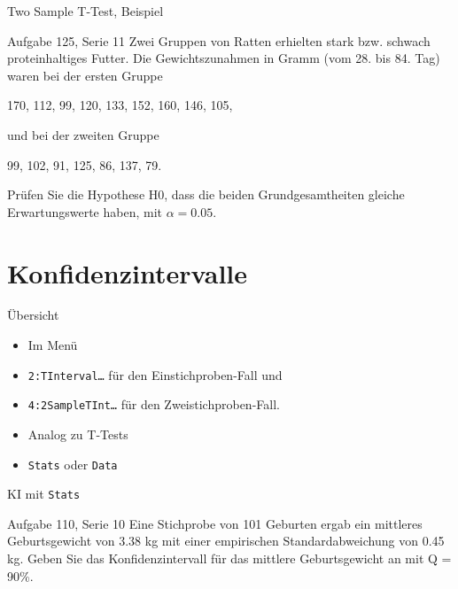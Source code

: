 \documentclass[handout]{beamer}
\newlength{\tikey}
\newcommand{\keystroke}[1]{\settowidth{\tikey}{\scriptsize #1}\psframebox[framearc=0.2]{\parbox{\tikey}{\scriptsize #1}}}
\begin{document}
\begin{frame}{Two Sample T-Test, Beispiel}
\begin{beamerboxesrounded}[shadow]{Aufgabe 125, Serie 11}
Zwei Gruppen von Ratten erhielten stark bzw. schwach proteinhaltiges Futter.
Die Gewichtszunahmen in Gramm (vom 28. bis 84. Tag) waren bei der ersten Gruppe
\begin{center}
170, 112, 99, 120, 133, 152, 160, 146, 105,
\end{center}
und bei der zweiten Gruppe
\begin{center}
99, 102, 91, 125, 86, 137, 79.
\end{center}

Prüfen Sie die Hypothese H0, dass die beiden Grundgesamtheiten gleiche
Erwartungswerte haben, mit $\alpha = 0.05$.
\end{beamerboxesrounded}
\end{frame}

\section[KI]{Konfidenzintervalle}
\begin{frame}{Übersicht}
\begin{itemize}
\item Im Menü \keystroke{F7}
\item \texttt{2:TInterval\ldots} für den Einstichproben-Fall und
\item \texttt{4:2SampleTInt\ldots} für den Zweistichproben-Fall.
\item Analog zu T-Tests
\item \texttt{Stats} oder \texttt{Data}
\end{itemize}
\end{frame}

\begin{frame}{KI mit \texttt{Stats}}
\begin{beamerboxesrounded}[shadow]{Aufgabe 110, Serie 10}
Eine Stichprobe von 101 Geburten ergab ein mittleres Geburtsgewicht von 3.38 kg
mit einer empirischen Standardabweichung von 0.45 kg. Geben Sie das
Konfidenzintervall für das mittlere Geburtsgewicht an mit Q = 90\%.
\end{beamerboxesrounded}
\end{frame}
\end{document}
